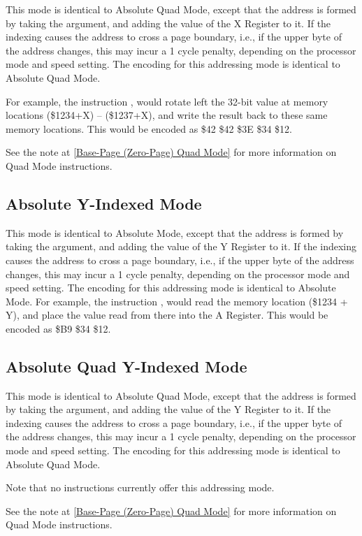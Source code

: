 This mode is identical to Absolute Quad Mode, except that the address is formed by taking the
argument, and adding the value of the X Register to it.  If the indexing causes the address
to cross a page boundary, i.e., if the upper byte of the address changes, this may incur a
1 cycle penalty, depending on the processor mode and speed setting.
The encoding for this addressing mode is identical to Absolute Quad Mode.

For example, the instruction , would rotate left the 32-bit value 
at memory locations (\$1234+X) -- (\$1237+X), and write the result back to these same memory locations.  This would
be encoded as \$42 \$42 \$3E \$34 \$12.

See the note at \ref{Base-Page (Zero-Page) Quad Mode} for more information on Quad Mode instructions.

\subsection{Absolute Y-Indexed Mode}

This mode is identical to Absolute Mode, except that the address is formed by taking the
argument, and adding the value of the Y Register to it.  If the indexing causes the address
to cross a page boundary, i.e., if the upper byte of the address changes, this may incur a
1 cycle penalty, depending on the processor mode and speed setting.
The encoding for this addressing mode is identical to Absolute Mode.
For example, the instruction , would read the
memory location (\$1234 + Y), and place the value read from there into the A Register.  This would
be encoded as \$B9 \$34 \$12.

\subsection{Absolute Quad Y-Indexed Mode}

This mode is identical to Absolute Quad Mode, except that the address is formed by taking the
argument, and adding the value of the Y Register to it.  If the indexing causes the address
to cross a page boundary, i.e., if the upper byte of the address changes, this may incur a
1 cycle penalty, depending on the processor mode and speed setting.
The encoding for this addressing mode is identical to Absolute Quad Mode.

Note that no instructions currently offer this addressing mode.

See the note at \ref{Base-Page (Zero-Page) Quad Mode} for more information on Quad Mode instructions.

